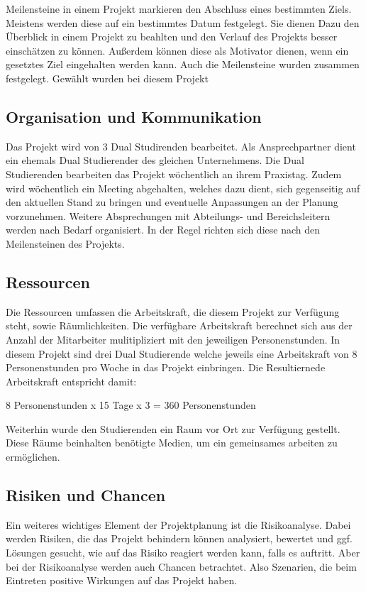 \documentclass[ThesisDJ.tex]{subfiles}
\begin{document}
Meilensteine in einem Projekt markieren den Abschluss eines bestimmten Ziels. Meistens werden diese auf ein bestimmtes Datum festgelegt. Sie dienen Dazu den Überblick in einem Projekt zu beahlten und den Verlauf des Projekts besser einschätzen zu können. Außerdem können diese als Motivator dienen, wenn ein gesetztes Ziel eingehalten werden kann. 
Auch die Meilensteine wurden zusammen festgelegt. Gewählt wurden bei diesem Projekt  


\subsection{Organisation und Kommunikation}
Das Projekt wird von 3 Dual Studirenden bearbeitet. Als Ansprechpartner dient ein ehemals Dual Studierender des gleichen Unternehmens. Die Dual Studierenden bearbeiten das Projekt wöchentlich an ihrem Praxistag. Zudem wird wöchentlich ein Meeting abgehalten, welches dazu dient, sich gegenseitig auf den aktuellen Stand zu bringen und eventuelle Anpassungen an der Planung vorzunehmen. Weitere Absprechungen mit Abteilungs- und Bereichsleitern werden nach Bedarf organisiert. In der Regel richten sich diese nach den Meilensteinen des Projekts.  

\subsection{Ressourcen}

Die Ressourcen umfassen die Arbeitskraft, die diesem Projekt zur Verfügung steht, sowie Räumlichkeiten. 
Die verfügbare Arbeitskraft berechnet sich aus der Anzahl der Mitarbeiter mulitipliziert mit den jeweiligen Personenstunden.
In diesem Projekt sind drei Dual Studierende welche jeweils eine Arbeitskraft von 8 Personenstunden pro Woche in das Projekt einbringen. 
Die Resultiernede Arbeitskraft entspricht damit:

		8 Personenstunden x 15 Tage x 3 = 360 Personenstunden

Weiterhin wurde den Studierenden ein Raum vor Ort zur Verfügung gestellt. Diese Räume beinhalten benötigte Medien, um ein gemeinsames arbeiten zu ermöglichen.

\subsection{Risiken und Chancen}
Ein weiteres wichtiges Element der Projektplanung ist die Risikoanalyse. Dabei werden Risiken, die das Projekt behindern können analysiert,
bewertet und ggf. Lösungen gesucht, wie auf das Risiko reagiert werden kann, falls es auftritt. 
Aber bei der Risikoanalyse werden auch Chancen betrachtet. Also Szenarien, die beim Eintreten positive Wirkungen auf das Projekt haben. 
\end{document}

